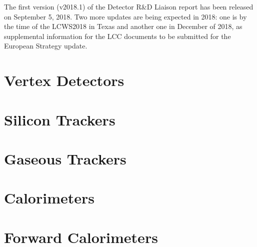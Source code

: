 \documentclass[10pt,final]{report}
\begin{document}
The first version (v2018.1) of the Detector R\&D Liaison report has been released on September 5, 2018. Two more updates are being expected in 2018: one is by the time of the LCWS2018 in Texas and another one in December of 2018, as supplemental information for the LCC documents to be submitted for the European Strategy update.

\chapter{Vertex Detectors}








\newpage

% 
\newpage
\chapter{Silicon Trackers}





\chapter{Gaseous Trackers}



\chapter{Calorimeters}













\chapter{Forward Calorimeters}



\end{document}

